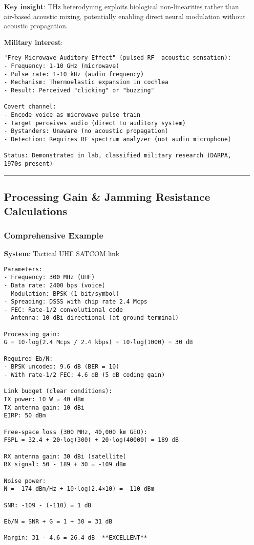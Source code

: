 \textbf{Key insight}: THz heterodyning exploits biological
non-linearities rather than air-based acoustic mixing, potentially
enabling direct neural modulation without acoustic propagation.

\textbf{Military interest}:

\begin{verbatim}
"Frey Microwave Auditory Effect" (pulsed RF  acoustic sensation):
- Frequency: 1-10 GHz (microwave)
- Pulse rate: 1-10 kHz (audio frequency)
- Mechanism: Thermoelastic expansion in cochlea
- Result: Perceived "clicking" or "buzzing"

Covert channel:
- Encode voice as microwave pulse train
- Target perceives audio (direct to auditory system)
- Bystanders: Unaware (no acoustic propagation)
- Detection: Requires RF spectrum analyzer (not audio microphone)

Status: Demonstrated in lab, classified military research (DARPA, 1970s-present)
\end{verbatim}

\begin{center}\rule{0.5\linewidth}{0.5pt}\end{center}

\subsection{\texorpdfstring{ Processing Gain \& Jamming Resistance
Calculations}{ Processing Gain \& Jamming Resistance Calculations}}\label{processing-gain-jamming-resistance-calculations}

\subsubsection{Comprehensive Example}\label{comprehensive-example}

\textbf{System}: Tactical UHF SATCOM link

\begin{verbatim}
Parameters:
- Frequency: 300 MHz (UHF)
- Data rate: 2400 bps (voice)
- Modulation: BPSK (1 bit/symbol)
- Spreading: DSSS with chip rate 2.4 Mcps
- FEC: Rate-1/2 convolutional code
- Antenna: 10 dBi directional (at ground terminal)

Processing gain:
G = 10·log(2.4 Mcps / 2.4 kbps) = 10·log(1000) = 30 dB

Required Eb/N:
- BPSK uncoded: 9.6 dB (BER = 10)
- With rate-1/2 FEC: 4.6 dB (5 dB coding gain)

Link budget (clear conditions):
TX power: 10 W = 40 dBm
TX antenna gain: 10 dBi
EIRP: 50 dBm

Free-space loss (300 MHz, 40,000 km GEO):
FSPL = 32.4 + 20·log(300) + 20·log(40000) = 189 dB

RX antenna gain: 30 dBi (satellite)
RX signal: 50 - 189 + 30 = -109 dBm

Noise power:
N = -174 dBm/Hz + 10·log(2.4×10) = -110 dBm

SNR: -109 - (-110) = 1 dB

Eb/N = SNR + G = 1 + 30 = 31 dB

Margin: 31 - 4.6 = 26.4 dB  **EXCELLENT**
\end{verbatim}

